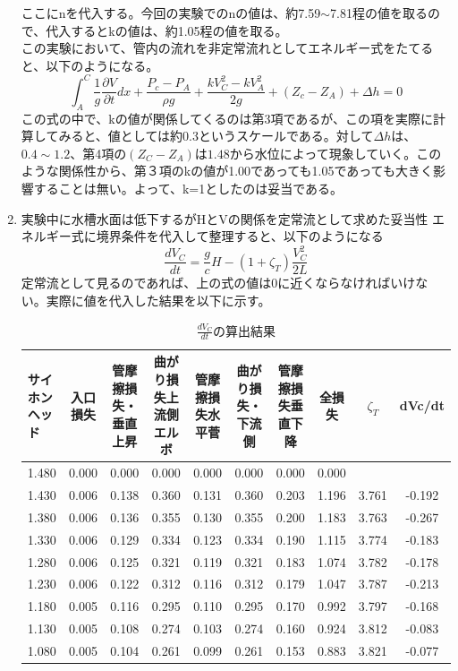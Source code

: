 \documentclass[a4j,twoside,openright,11pt]{jarticle}
\begin{document}
\begin{enumerate}
ここにnを代入する。今回の実験でのnの値は、約7.59$\sim$7.81程の値を取るので、代入するとkの値は、約1.05程の値を取る。\\
この実験において、管内の流れを非定常流れとしてエネルギー式をたてると、以下のようになる。
\begin{equation}
\int_A^C \frac{1}{g}\frac{\partial V}{\partial t}dx +\frac{P_c-P_A}{\rho g}+\frac{kV_C^2 - kV_A^2}{2g} + (Z_c - Z_A) +\Delta h = 0
\end{equation}
この式の中で、kの値が関係してくるのは第3項であるが、この項を実際に計算してみると、値としては約0.3というスケールである。対して$\Delta h$は、$0.4 \sim 1.2$、第4項の$(Z_C-Z_A)$は$1.48$から水位によって現象していく。このような関係性から、第３項のkの値が1.00であっても1.05であっても大きく影響することは無い。よって、k=1としたのは妥当である。
\item 実験中に水槽水面は低下するがHとVの関係を定常流として求めた妥当性
エネルギー式に境界条件を代入して整理すると、以下のようになる
\begin{equation}
\frac{dV_C}{dt}=\frac{g}{c}H-(1+\zeta_T)\frac{V_C^2}{2L}
\end{equation}
定常流として見るのであれば、上の式の値は0に近くならなければいけない。実際に値を代入した結果を以下に示す。
\begin{table}[htb]
\begin{center}
  \caption{$\frac{dV_C}{dt}$の算出結果}\tiny
  \begin{tabular}{|l||c|c|c|c|c|c|c|c|c|} \hline
サイホンヘッド&入口損失&管摩擦損失・垂直上昇&曲がり損失上流側エルボ&管摩擦損失水平菅&曲がり損失・下流側&管摩擦損失垂直下降&全損失&$\zeta_T$ & dVc/dt\\\hline
1.480&0.000&0.000&0.000&0.000&0.000&0.000&0.000&&\\
1.430&0.006&0.138&0.360&0.131&0.360&0.203&1.196&3.761&-0.192\\
1.380&0.006&0.136&0.355&0.130&0.355&0.200&1.183&3.763&-0.267\\
1.330&0.006&0.129&0.334&0.123&0.334&0.190&1.115&3.774&-0.183\\
1.280&0.006&0.125&0.321&0.119&0.321&0.183&1.074&3.782&-0.178\\
1.230&0.006&0.122&0.312&0.116&0.312&0.179&1.047&3.787&-0.213\\
1.180&0.005&0.116&0.295&0.110&0.295&0.170&0.992&3.797&-0.168\\
1.130&0.005&0.108&0.274&0.103&0.274&0.160&0.924&3.812&-0.083\\
1.080&0.005&0.104&0.261&0.099&0.261&0.153&0.883&3.821&-0.077\\

\end{tabular}
\end{center}
\end{table}
\end{enumerate}
\end{document}
